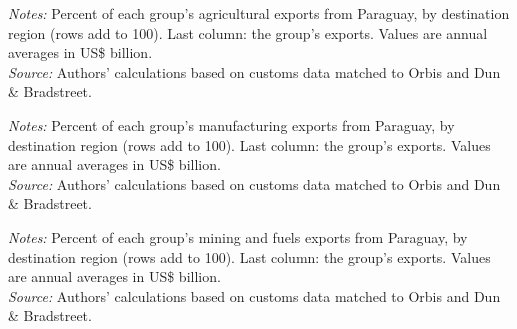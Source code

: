 \documentclass[11pt,a4paper]{article}
\begin{document}
\begin{table}[H]\centering\small%
  \caption{Paraguay, Agriculture: Multinational Exports by Parent Region and Destination Region}%
  \label{tab:c_reg_PRY_agro}%
  \par\vspace{3pt}%
  \begin{minipage}{0.95\textwidth}\footnotesize %
  \textit{Notes:} Percent of each group's agricultural exports from Paraguay, by destination region (rows add to 100). Last column: the group's exports. Values are annual averages in US\$ billion.\\[3pt]%
  \textit{Source:} Authors' calculations based on customs data matched to Orbis and Dun \& Bradstreet.%
  \end{minipage}%
  \end{table}
\begin{table}[H]\centering\small%
  \caption{Paraguay, Manufacturing: Multinational Exports by Parent Region and Destination Region}%
  \label{tab:c_reg_PRY_manufacturing}%
  \par\vspace{3pt}%
  \begin{minipage}{0.95\textwidth}\footnotesize %
  \textit{Notes:} Percent of each group's manufacturing exports from Paraguay, by destination region (rows add to 100). Last column: the group's exports. Values are annual averages in US\$ billion.\\[3pt]%
  \textit{Source:} Authors' calculations based on customs data matched to Orbis and Dun \& Bradstreet.%
  \end{minipage}%
  \end{table}
\begin{table}[H]\centering\small%
  \caption{Paraguay, Mining and Fuels: Multinational Exports by Parent Region and Destination Region}%
  \label{tab:c_reg_PRY_mining}%
  \par\vspace{3pt}%
  \begin{minipage}{0.95\textwidth}\footnotesize %
  \textit{Notes:} Percent of each group's mining and fuels exports from Paraguay, by destination region (rows add to 100). Last column: the group's exports. Values are annual averages in US\$ billion.\\[3pt]%
  \textit{Source:} Authors' calculations based on customs data matched to Orbis and Dun \& Bradstreet.%
  \end{minipage}%
  \end{table}
\end{document}
